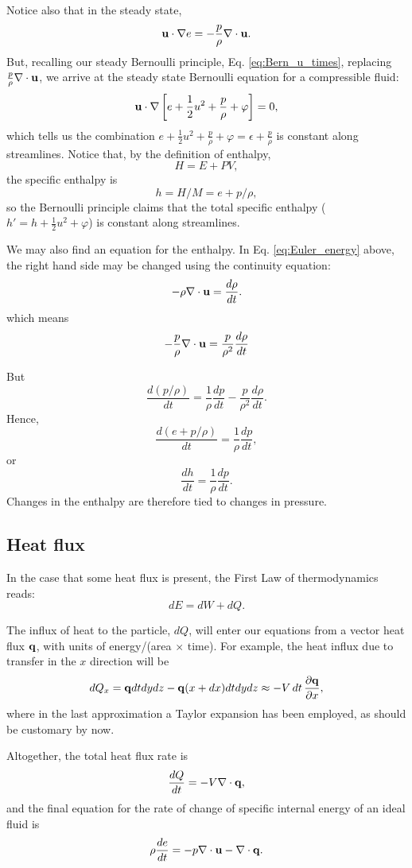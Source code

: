 Notice also that in the steady state,
\[
\mathbf{u} \cdot \nabla e = -  \frac{p}{\rho} \nabla\cdot \mathbf{u}.
\]
But, recalling our steady Bernoulli principle,
Eq. \ref{eq:Bern_u_times}, replacing
$\frac{p}{\rho} \nabla\cdot \mathbf{u}$, we arrive at the steady state
Bernoulli equation for a compressible fluid:
\[
\mathbf{u} \cdot \nabla \left[ e + \frac12 u^2 + \frac{p}{\rho} + \varphi
  \right] = 0 ,
\]
%
which tells us the combination $ e + \frac12 u^2 + \frac{p}{\rho} +
\varphi = \epsilon + \frac{p}{\rho} $ is constant along streamlines.
Notice that, by the definition of enthalpy,
\[
H= E + P V ,
\]
the specific enthalpy is
\[
h=H/M = e + p / \rho ,
\]
so the Bernoulli principle claims that the total specific enthalpy
($h'=h + \frac12 u^2 + \varphi$) is constant along streamlines.

We may also find an equation for the enthalpy. In
Eq. \ref{eq:Euler_energy} above, the right hand side may be changed
using the continuity equation:
\[
- \rho \nabla\cdot \mathbf{u} = \frac{d\rho}{dt} .
\]
which means
\[
-  \frac{p}{\rho} \nabla\cdot \mathbf{u} =
\frac{p}{\rho^2} \frac{d\rho}{dt}
\]

But
\[
\frac{d (p / \rho) }{dt} =
\frac{ 1 }{\rho} 
\frac{d p }{dt} -
\frac{ p }{\rho^2} 
\frac{d \rho }{dt}  .
\]
Hence,
\[
\frac{d ( e + p / \rho) }{dt} = \frac{ 1 }{\rho} \frac{d p }{dt} ,
\]
or
\[
\frac{d h }{dt} = \frac{ 1 }{\rho} \frac{d p }{dt} .
\]
Changes in the enthalpy are therefore tied to changes in pressure.


\subsection{Heat flux}

In the case that some heat flux is present, the First Law of
thermodynamics reads:
\[
dE=dW + dQ .
\]

The influx of heat to the particle, $dQ$, will enter our equations
from a vector heat flux $\mathbf{q}$, with units of energy/(area $\times$
time). For example, the heat influx due to transfer in the $x$ direction
will be
\[
dQ_x= \mathbf{q} dt dy dz - \mathbf{q}(x+dx) dt dy dz \approx
      - V \, dt \, \frac{\partial\mathbf{q}}{\partial x},
\]
where in the last approximation a Taylor expansion has been employed,
as should be customary by now.

Altogether, the total heat flux rate is
\[
\frac{dQ}{dt} = -V \nabla\cdot \mathbf{q},
\]
and the final equation for the rate of change of specific internal
energy of an ideal fluid is
\begin{equation}
  \label{eq:Euler_energy_w_q}
  \rho \frac{de}{dt}  = -  p \nabla\cdot \mathbf{u}  - \nabla\cdot \mathbf{q} .
\end{equation}



